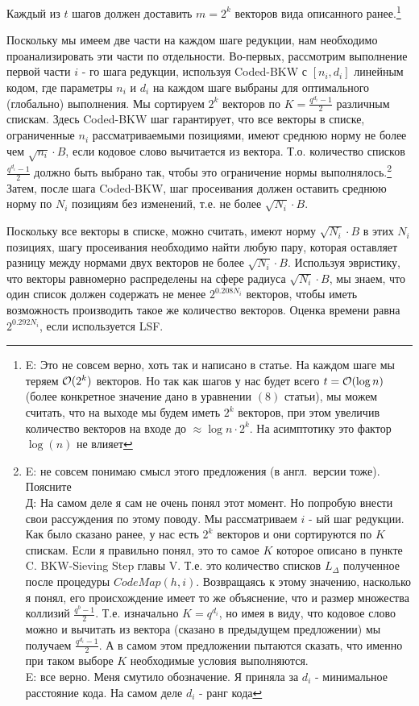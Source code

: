 \documentclass[a4paper,11pt]{article}
\begin{document}
Каждый из $t$ шагов должен доставить $m=2^k$ векторов вида описанного ранее.\footnote{E: Это не совсем верно, хоть так и написано в статье. На каждом шаге мы теряем $\mathcal{O}(2^k)$ векторов. Но так как шагов у нас будет всего $t = \mathcal{O}(\log n)$ (более конкретное значение дано в уравнении $(8)$ статьи), мы можем считать, что на выходе мы будем иметь $2^k$ векторов, при этом увеличив количество векторов на входе до $\approx \log n \cdot 2^k$. На асимптотику это фактор $\log(n)$ не влияет}

Поскольку мы имеем две части на каждом шаге редукции, нам необходимо проанализировать эти части по отдельности. Во-первых, рассмотрим выполнение первой части $i$ - го шага редукции, используя Coded-BKW с $[n_i,d_i]$ линейным кодом, где параметры $n_i$ и $d_i$ на каждом шаге выбраны для оптимального (глобально) выполнения. Мы сортируем $2^k$ векторов по $K=\frac{q^{d_i} - 1}{2}$ различным спискам. Здесь Coded-BKW шаг гарантирует, что все векторы в списке, ограниченные $n_i$ рассматриваемыми позициями, имеют среднюю норму не более чем $\sqrt{n_i}\cdot B$, если кодовое слово вычитается из вектора. Т.о. количество списков $\frac{q^{d_i} - 1}{2}$ должно быть выбрано так, чтобы это ограничение нормы выполнялось.\footnote{E: не совсем понимаю смысл этого предложения (в англ.\ версии тоже). Поясните \\ Д: На самом деле я сам не очень понял этот момент. Но попробую внести свои рассуждения по этому поводу. Мы рассматриваем $i$ - ый шаг редукции. Как было сказано ранее, у нас есть $2^k$ векторов и они сортируются по $K$ спискам. Если я правильно понял, это то самое $K$ которое описано в пункте C. BKW-Sieving Step главы V. Т.е. это количество списков $L_{\Delta}$ полученное после процедуры $CodeMap(h,i)$. Возвращаясь к этому значению, насколько я понял, его происхождение имеет то же объяснение, что и размер множества коллизий $\frac{q^b-1}{2}$. Т.е. изначально $K=q^{d_i}$, но имея в виду, что кодовое слово можно и вычитать из вектора (сказано в предыдущем предложении) мы получаем $\frac{q^{d_i}-1}{2}$. А в самом этом предложении пытаются сказать, что именно при таком выборе $K$ необходимые условия выполняются. \\
E: все верно. Меня смутило обозначение. Я приняла за $d_i$ - минимальное расстояние кода. На самом деле $d_i$ - ранг кода
} Затем, после шага Coded-BKW, шаг просеивания должен оставить среднюю норму по $N_i$ позициям без изменений, т.е. не более $\sqrt{N_i}\cdot B$.

Поскольку все векторы в списке, можно считать, имеют норму $\sqrt{N_i}\cdot B$ в этих $N_i$ позициях, шагу просеивания необходимо найти любую пару, которая оставляет разницу между нормами двух векторов не более $\sqrt{N_i}\cdot B$. Используя эвристику, что векторы равномерно распределены на сфере радиуса $\sqrt{N_i}\cdot B$, мы знаем, что один список должен содержать не менее $2^{0.208N_i }$ векторов, чтобы иметь возможность производить такое же количество векторов. Оценка времени равна $2^{0.292N_i}$, если используется LSF.
\end{document}
